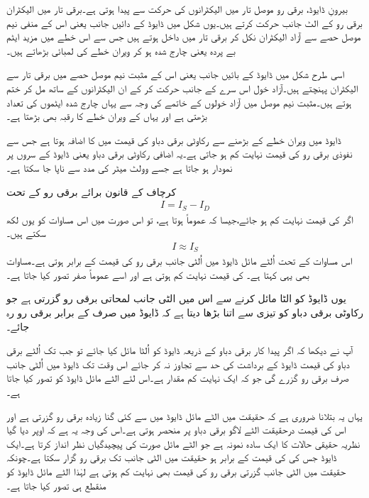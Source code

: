 بیرونِ ڈایوڈ، برقی رو موصل تار میں الیکٹرانوں کی حرکت سے پیدا ہوتی ہے۔برقی تار میں الیکٹران برقی رو  کے الٹ جانب حرکت کرتے ہیں۔یوں شکل میں ڈایوڈ کے دائیں جانب یعنی اس کے منفی نیم موصل حصے سے آزاد الیکٹران نکل کر برقی تار میں داخل ہوتے ہیں جس سے اس خطے میں مزید ایٹم  بے پردہ یعنی چارج شدہ ہو کر ویران خطے کی لمبائی بڑھاتے ہیں۔

اسی طرح شکل میں ڈایوڈ کے بائیں جانب یعنی اس کے مثبت نیم موصل حصے میں برقی تار سے الیکٹران پہنچتے ہیں۔آزاد خول اس سرے کے جانب حرکت کر کے ان الیکٹرانوں کے ساتھ مل کر ختم ہوتے ہیں۔مثبت نیم موصل میں آزاد خولوں کے خاتمے کی وجہ سے یہاں چارج شدہ ایٹموں کی تعداد بڑھتی ہے اور یہاں کے ویران خطے کا رقبہ بھی بڑھتا ہے۔

ڈایوڈ میں ویران خطے کے بڑھنے سے رکاوٹی برقی دباو کی قیمت میں  کا اضافہ ہوتا ہے جس سے نفوذی برقی رو  کی قیمت نہایت کم ہو جاتی ہے۔یہ اضافی رکاوٹی برقی دباو یعنی   ڈایوڈ کے سروں پر نمودار ہو جاتا ہے  جسے وولٹ میٹر کی مدد سے ناپا جا سکتا ہے۔

کرچاف کے قانون برائے برقی رو کے تحت 
\begin{align}
I=I_S-I_D
\end{align}
اگر  کی قیمت نہایت کم ہو جائے،جیسا کہ عموماً ہوتا ہے، تو اس صورت میں اس مساوات کو یوں لکھ سکتے ہیں۔
\begin{align}
I \approx I_S
\end{align}
اس مساوات کے تحت اُلٹے مائل ڈایوڈ میں اُلٹی جانب برقی رو کی قیمت  کے برابر ہوتی ہے۔مساوات   بھی یہی کہتا ہے۔ کی قیمت نہایت کم ہوتی ہے اور اسے عموماً صفر تصور کیا جاتا ہے۔

یوں ڈایوڈ کو الٹا مائل کرنے سے اس میں الٹی جانب لمحاتی برقی رو گزرتی ہے جو رکاوٹی برقی دباو کو تیزی سے اتنا بڑھا دیتا ہے کہ ڈایوڈ میں صرف   کے برابر برقی رو رہ جائے۔

آپ نے دیکھا کہ اگر پیدا کار برقی دباو  کے ذریعہ ڈایوڈ کو اُلٹا مائل کیا جائے تو جب تک اُلٹے برقی دباو کی قیمت ڈایوڈ کے برداشت کی حد سے تجاوز نہ کر جائے اس وقت تک ڈایوڈ میں اُلٹی جانب صرف  برقی رو گزرے گی جو کہ ایک نہایت کم مقدار ہے۔اس لئے الٹے مائل  ڈایوڈ کو   تصور کیا جاتا ہے۔

یہاں یہ بتلانا ضروری ہے کہ حقیقت میں الٹے مائل  ڈایوڈ میں   سے کئی گنا زیادہ برقی رو گزرتی ہے اور اس کی قیمت درحقیقت الٹے لاگو برقی دباو پر منحصر ہوتی ہے۔اس کی وجہ یہ ہے کہ اوپر دیا گیا نظریہ حقیقی حالات کا ایک سادہ نمونہ ہے جو الٹے مائل صورت کی پیچیدگیاں نظر انداز کرتا ہے۔ایک ڈایوڈ جس کی  کی قیمت  کے برابر ہو حقیقت میں الٹی جانب    تک برقی رو گزار سکتا ہے۔چونکہ حقیقت میں الٹی جانب گزرتی برقی رو کی قیمت بھی نہایت کم ہوتی ہے لہٰذا الٹے مائل  ڈایوڈ کو منقطع ہی تصور کیا جاتا ہے۔


